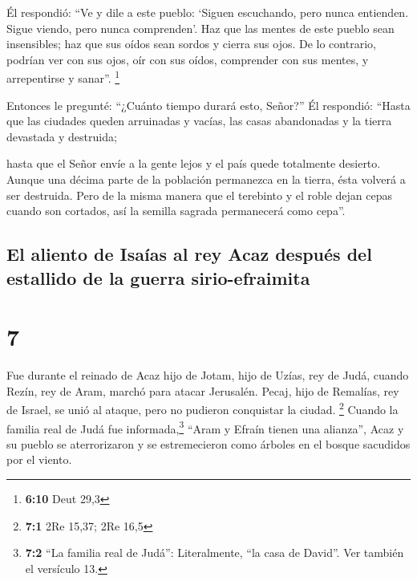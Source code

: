  Él respondió: ``Ve y dile a este pueblo: `Siguen
escuchando, pero nunca entienden. Sigue viendo, pero nunca comprenden'.
 Haz que las mentes de este pueblo sean insensibles; haz
que sus oídos sean sordos y cierra sus ojos. De lo contrario, podrían
ver con sus ojos, oír con sus oídos, comprender con sus mentes, y
arrepentirse y sanar''. \footnote{\textbf{6:10} Deut 29,3}

 Entonces le pregunté: ``¿Cuánto tiempo durará esto,
Señor?'' Él respondió: ``Hasta que las ciudades queden arruinadas y
vacías, las casas abandonadas y la tierra devastada y destruida;

 hasta que el Señor envíe a la gente lejos y el país
quede totalmente desierto.  Aunque una décima parte de la
población permanezca en la tierra, ésta volverá a ser destruida. Pero de
la misma manera que el terebinto y el roble dejan cepas cuando son
cortados, así la semilla sagrada permanecerá como cepa''.

\hypertarget{el-aliento-de-isauxedas-al-rey-acaz-despuuxe9s-del-estallido-de-la-guerra-sirio-efraimita}{%
\subsection{El aliento de Isaías al rey Acaz después del estallido de la
guerra
sirio-efraimita}\label{el-aliento-de-isauxedas-al-rey-acaz-despuuxe9s-del-estallido-de-la-guerra-sirio-efraimita}}

\hypertarget{section-6}{%
\section{7}\label{section-6}}

 Fue durante el reinado de Acaz hijo de Jotam, hijo de
Uzías, rey de Judá, cuando Rezín, rey de Aram, marchó para atacar
Jerusalén. Pecaj, hijo de Remalías, rey de Israel, se unió al ataque,
pero no pudieron conquistar la ciudad. \footnote{\textbf{7:1} 2Re 15,37;
  2Re 16,5}  Cuando la familia real de Judá fue
informada,\footnote{\textbf{7:2} ``La familia real de Judá'':
  Literalmente, ``la casa de David''. Ver también el versículo 13.}
``Aram y Efraín tienen una alianza'', Acaz y su pueblo se aterrorizaron
y se estremecieron como árboles en el bosque sacudidos por el viento.

